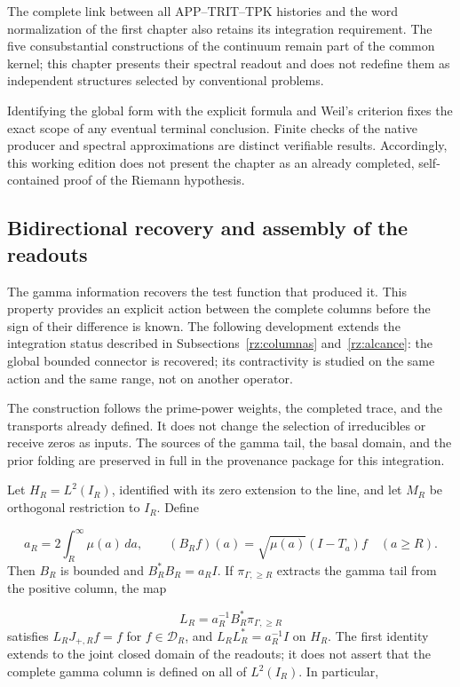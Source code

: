 The complete link between all APP–TRIT–TPK histories and the word normalization of the first chapter also retains its integration requirement. The five consubstantial constructions of the continuum remain part of the common kernel; this chapter presents their spectral readout and does not redefine them as independent structures selected by conventional problems.

Identifying the global form with the explicit formula and Weil's criterion fixes the exact scope of any eventual terminal conclusion. Finite checks of the native producer and spectral approximations are distinct verifiable results. Accordingly, this working edition does not present the chapter as an already completed, self-contained proof of the Riemann hypothesis.

\subsection{Bidirectional recovery and assembly of the readouts}
\label{rz:gamma}
The gamma information recovers the test function that produced it. This property provides an explicit action between the complete columns before the sign of their difference is known. The following development extends the integration status described in Subsections~\ref{rz:columnas} and~\ref{rz:alcance}: the global bounded connector is recovered; its contractivity is studied on the same action and the same range, not on another operator.

The construction follows the prime-power weights, the completed trace, and the transports already defined. It does not change the selection of irreducibles or receive zeros as inputs. The sources of the gamma tail, the basal domain, and the prior folding are preserved in full in the provenance package for this integration.

Let \(H_R=L^2(I_R)\), identified with its zero extension to the line, and let \(M_R\) be orthogonal restriction to \(I_R\). Define

\[
a_R=2\int_R^\infty\mu(a)\,da,\qquad
(B_Rf)(a)=\sqrt{\mu(a)}(I-T_a)f\quad(a\geq R).
\]
Then \(B_R\) is bounded and \(B_R^*B_R=a_RI\). If \(\pi_{\Gamma,\geq R}\) extracts the gamma tail from the positive column, the map

\[
L_R=a_R^{-1}B_R^*\pi_{\Gamma,\geq R}
\]
satisfies \(L_RJ_{+,R}f=f\) for \(f\in\mathcal D_R\), and \(L_RL_R^*=a_R^{-1}I\) on \(H_R\). The first identity extends to the joint closed domain of the readouts; it does not assert that the complete gamma column is defined on all of \(L^2(I_R)\). In particular,

